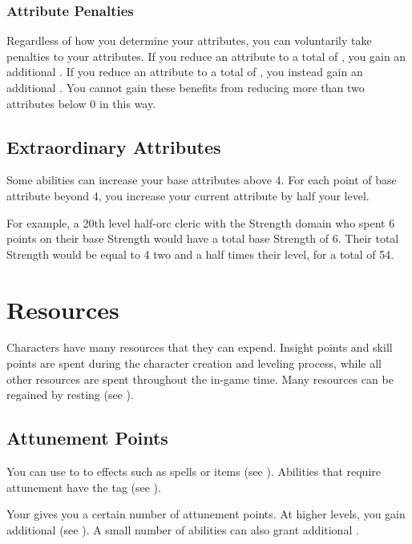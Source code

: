         \subsubsection{Attribute Penalties}\label{Attribute Penalties}
            Regardless of how you determine your attributes, you can voluntarily take penalties to your attributes.
            If you reduce an attribute to a total of , you gain an additional .
            If you reduce an attribute to a total of , you instead gain an additional .
            You cannot gain these benefits from reducing more than two attributes below 0 in this way.

    \subsection{Extraordinary Attributes}
        Some abilities can increase your base attributes above 4.
        For each point of base attribute beyond 4, you increase your current attribute by half your level.

        For example, a 20th level half-orc cleric with the Strength domain who spent 6 points on their base Strength would have a total base Strength of 6.
        Their total Strength would be equal to 4 \add two and a half times their level, for a total of 54.

\section{Resources}\label{Resources}

    Characters have many resources that they can expend.
    Insight points and skill points are spent during the character creation and leveling process, while all other resources are spent throughout the in-game time.
    Many resources can be regained by resting (see ).

    \subsection{Attunement Points}\label{Attunement Points}
        You can use  to  to effects such as spells or items (see ).
        Abilities that require attunement have the  tag (see ).

        Your  gives you a certain number of attunement points.
        At higher levels, you gain additional  (see ).
        A small number of abilities can also grant additional .

